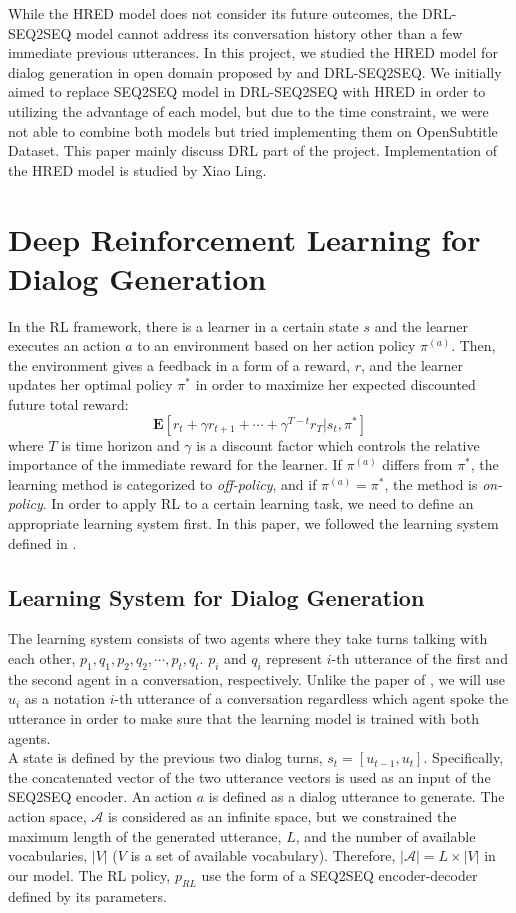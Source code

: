 \documentclass[letterpaper]{article}
\begin{document}
While the HRED model does not consider its future outcomes, the DRL-SEQ2SEQ model cannot address its conversation history other than a few immediate previous utterances. In this project, we studied the HRED model for dialog generation in open domain proposed by \cite{Serban} and DRL-SEQ2SEQ. We initially aimed to replace SEQ2SEQ model in DRL-SEQ2SEQ with HRED in order to utilizing the advantage of each model, but due to the time constraint, we were not able to combine both models but tried implementing them on OpenSubtitle Dataset. This paper mainly discuss DRL part of the project. Implementation of the HRED model is studied by Xiao Ling.

\section{Deep Reinforcement Learning for Dialog Generation}
In the RL framework, there is a learner in a certain state $s$ and the learner executes an action $a$ to an environment based on her action policy $\pi^{(a)}$. Then, the environment gives a feedback in a form of a reward, $r$, and the learner updates her optimal policy $\pi^*$ in order to maximize her expected discounted future total reward: 
\[
	\mathbf{E}[r_t + \gamma r_{t+1} + \cdots + \gamma^{T-t}r_T | s_t, \pi^* ]
\]
where $T$ is time horizon and $\gamma$ is a discount factor which controls the relative importance of the immediate reward for the learner. If $\pi^{(a)}$ differs from $\pi^*$, the learning method is categorized to \textit{off-policy}, and if $\pi^{(a)} = \pi^*$, the method is \textit{on-policy}. In order to apply RL to a certain learning task, we need to define an appropriate learning system first. In this paper, we followed the learning system defined in \cite{Li}. 
\subsection{Learning System for Dialog Generation}
The learning system consists of two agents where they take turns talking with each other, $p_1, q_1, p_2, q_2, \cdots, p_t, q_t$. $p_i$ and $q_i$ represent $i$-th utterance of the first and the second agent in a conversation, respectively. Unlike the paper of \cite{Li}, we will use $u_i$ as a notation $i$-th utterance of a conversation regardless which agent spoke the utterance in order to make sure that the learning model is trained with both agents. \\
A state is defined by the previous two dialog turns, $s_t = [u_{t-1}, u_t]$. Specifically, the concatenated vector of the two utterance vectors is used as an input of the SEQ2SEQ encoder. An action $a$ is defined as a dialog utterance to generate. The action space, $\mathcal{A}$ is considered as an infinite space, but we constrained the maximum length of the generated utterance, $L$, and the number of available vocabularies, $|V|$ ($V$ is a set of available vocabulary). Therefore, $|\mathcal{A}|=L\times |V|$ in our model. The RL policy, $p_{RL}$ use the form of a SEQ2SEQ encoder-decoder defined by its parameters. 
\end{document}
